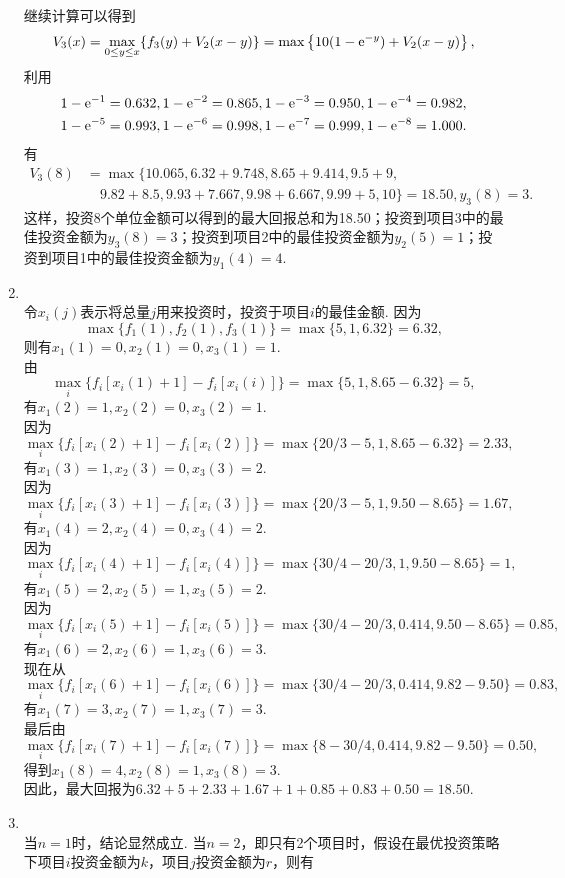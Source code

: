 \begin{enumerate}[label=\arabic{section}.\arabic*]
    继续计算可以得到
    \[V_3(x)=\max_{0 \leq y \leq x} \{f_3(y)+V_2(x-y)\}=\max\left\{10(1-\mathrm{e}^{-y})+V_2(x-y)\right\},\]
    利用
    \begin{align*}
        1-\mathrm{e}^{-1}&=0.632,1-\mathrm{e}^{-2}=0.865,1-\mathrm{e}^{-3}=0.950,1-\mathrm{e}^{-4}=0.982,\\
        1-\mathrm{e}^{-5}&=0.993,1-\mathrm{e}^{-6}=0.998,1-\mathrm{e}^{-7}=0.999,1-\mathrm{e}^{-8}=1.000.
    \end{align*}
    有
    \begin{align*}
        V_3(8) & = \max\{10.065,6.32+9.748,8.65+9.414,9.5+9,\\
        & \quad 9.82+8.5,9.93+7.667,9.98+6.667,9.99+5,10\}=18.50, y_3(8)=3.
    \end{align*}
    这样，投资8个单位金额可以得到的最大回报总和为18.50；投资到项目3中的最佳投资金额为$y_3(8)=3$；投资到项目2中的最佳投资金额为$y_2(5)=1$；投资到项目1中的最佳投资金额为$y_1(4)=4$.
    \item \sol\\
    令$x_i(j)$表示将总量$j$用来投资时，投资于项目$i$的最佳金额. 因为
    \[\max\{f_1(1),f_2(1),f_3(1)\}=\max\{5,1,6.32\}=6.32,\]
    则有$x_1(1)=0,x_2(1)=0,x_3(1)=1$.\\
    由\[\max_i\{f_i[x_i(1)+1]-f_i[x_i(i)]\}=\max\{5,1,8.65-6.32\}=5,\]
    有$x_1(2)=1,x_2(2)=0,x_3(2)=1$.\\
    因为\[\max_i\{f_i[x_i(2)+1]-f_i[x_i(2)]\}=\max\{20/3-5,1,8.65-6.32\}=2.33,\]
    有$x_1(3)=1,x_2(3)=0,x_3(3)=2$.\\
    因为\[\max_i\{f_i[x_i(3)+1]-f_i[x_i(3)]\}=\max\{20/3-5,1,9.50-8.65\}=1.67,\]
    有$x_1(4)=2,x_2(4)=0,x_3(4)=2$.\\
    因为\[\max_i\{f_i[x_i(4)+1]-f_i[x_i(4)]\}=\max\{30/4-20/3,1,9.50-8.65\}=1,\]
    有$x_1(5)=2,x_2(5)=1,x_3(5)=2$.\\
    因为\[\max_i\{f_i[x_i(5)+1]-f_i[x_i(5)]\}=\max\{30/4-20/3,0.414,9.50-8.65\}=0.85,\]
    有$x_1(6)=2,x_2(6)=1,x_3(6)=3$.\\
    现在从\[\max_i\{f_i[x_i(6)+1]-f_i[x_i(6)]\}=\max\{30/4-20/3,0.414,9.82-9.50\}=0.83,\]
    有$x_1(7)=3,x_2(7)=1,x_3(7)=3$.\\
    最后由\[\max_i\{f_i[x_i(7)+1]-f_i[x_i(7)]\}=\max\{8-30/4,0.414,9.82-9.50\}=0.50,\]
    得到$x_1(8)=4,x_2(8)=1,x_3(8)=3$.\\
    因此，最大回报为$6.32+5+2.33+1.67+1+0.85+0.83+0.50=18.50$.
    \item \pro\\
    当$n=1$时，结论显然成立. 当$n=2$，即只有2个项目时，假设在最优投资策略下项目$i$投资金额为$k$，项目$j$投资金额为$r$，则有

\end{enumerate}
